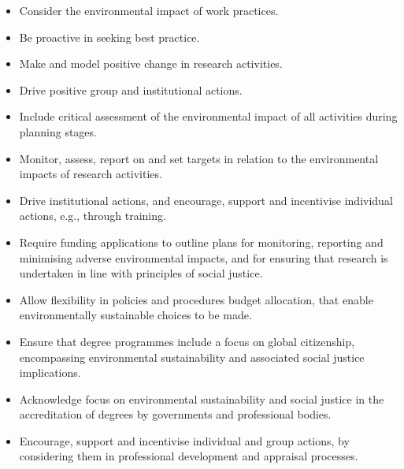 \documentclass[../SustainableHEP.tex]{subfiles}
\begin{document}

\clearpage
\begin{minipage}{\textwidth}
\begin{reco2}{\currentname}
{
\begin{itemize}[leftmargin=6 mm]
\setlength\itemsep{\recskip}
\item Consider the environmental impact of work practices.

\item Be proactive in seeking best practice.

\item Make and model positive change in research activities.

\item Drive positive group and institutional actions.
\end{itemize}
}
{
\begin{itemize}[leftmargin=6 mm]
\setlength\itemsep{\recskip}
\item  Include critical assessment of the environmental impact of all activities during planning stages.

\item  Monitor, assess, report on and set targets in relation to the environmental impacts of research activities.

\item Drive institutional actions, and encourage, support and incentivise individual actions, e.g., through training.

\end{itemize}
}
{
\begin{itemize}[leftmargin=6 mm]
\setlength\itemsep{\recskip}
\item Require funding applications to outline plans for monitoring, reporting and minimising adverse environmental impacts, and for ensuring that research is undertaken in line with principles of social justice.

\item Allow flexibility in policies and procedures \eg budget allocation, that enable environmentally sustainable choices to be made.

\item Ensure that degree programmes include a focus on global citizenship, encompassing environmental sustainability and associated social justice implications.

\item Acknowledge focus on environmental sustainability and social justice in the accreditation of degrees by governments and professional bodies.

\item Encourage, support and incentivise individual and group actions, \eg by considering them in professional development and appraisal processes.

\end{itemize}
}

\end{reco2}
\end{minipage}
\end{document}
